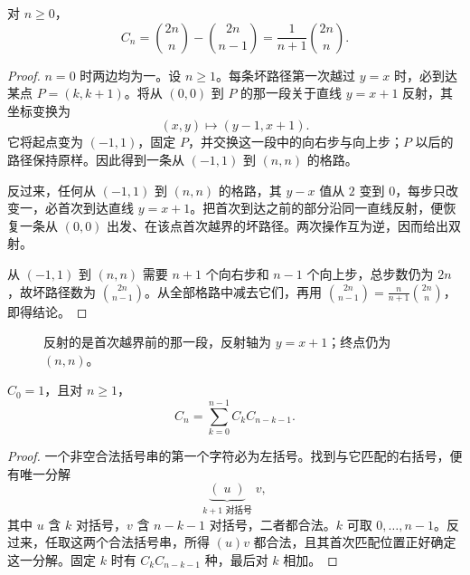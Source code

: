 \documentclass[lang=cn,a4paper,fontset=none,zihao=false,10pt,openany,twoside]{beautybook}
\numberwithin{algorithm}{chapter}
\begin{document}
\begin{theorem}\label{thm:catalan-formula}
对 $n\ge0$，
\[
 C_n=\binom{2n}n-\binom{2n}{n-1}
 =\frac1{n+1}\binom{2n}n.
\]
\end{theorem}
\begin{proof}
$n=0$ 时两边均为一。设 $n\ge1$。每条坏路径第一次越过 $y=x$ 时，必到达某点 $P=(k,k+1)$。将从 $(0,0)$ 到 $P$ 的那一段关于直线 $y=x+1$ 反射，其坐标变换为
\[
 (x,y)\longmapsto(y-1,x+1).
\]
它将起点变为 $(-1,1)$，固定 $P$，并交换这一段中的向右步与向上步；$P$ 以后的路径保持原样。因此得到一条从 $(-1,1)$ 到 $(n,n)$ 的格路。

反过来，任何从 $(-1,1)$ 到 $(n,n)$ 的格路，其 $y-x$ 值从 $2$ 变到 $0$，每步只改变一，必首次到达直线 $y=x+1$。把首次到达之前的部分沿同一直线反射，便恢复一条从 $(0,0)$ 出发、在该点首次越界的坏路径。两次操作互为逆，因而给出双射。

从 $(-1,1)$ 到 $(n,n)$ 需要 $n+1$ 个向右步和 $n-1$ 个向上步，总步数仍为 $2n$，故坏路径数为 $\binom{2n}{n-1}$。从全部格路中减去它们，再用 $\binom{2n}{n-1}=\frac n{n+1}\binom{2n}n$，即得结论。
\end{proof}
\begin{figure}[H]
\centering
{}
\caption{反射的是首次越界前的那一段，反射轴为 $y=x+1$；终点仍为 $(n,n)$。}
\end{figure}

\begin{proposition}\label{prop:catalan-recurrence}
$C_0=1$，且对 $n\ge1$，
\[
 C_n=\sum_{k=0}^{n-1}C_kC_{n-k-1}.
\]
\end{proposition}
\begin{proof}
一个非空合法括号串的第一个字符必为左括号。找到与它匹配的右括号，便有唯一分解
\[
 \underbrace{(\;u\;)}_{k+1\text{ 对括号}}\;v,
\]
其中 $u$ 含 $k$ 对括号，$v$ 含 $n-k-1$ 对括号，二者都合法。$k$ 可取 $0,\ldots,n-1$。反过来，任取这两个合法括号串，所得 $(u)v$ 都合法，且其首次匹配位置正好确定这一分解。固定 $k$ 时有 $C_kC_{n-k-1}$ 种，最后对 $k$ 相加。
\end{proof}
\end{document}
